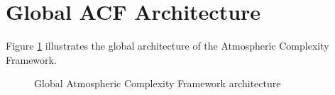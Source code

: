 \section{Global ACF Architecture}


Figure \ref{fig:acfarchitecture}
illustrates the global architecture of the Atmospheric Complexity Framework.


\begin{figure}[h]
\centering



\caption{Global Atmospheric Complexity Framework architecture}

\label{fig:acfarchitecture}

\end{figure}
